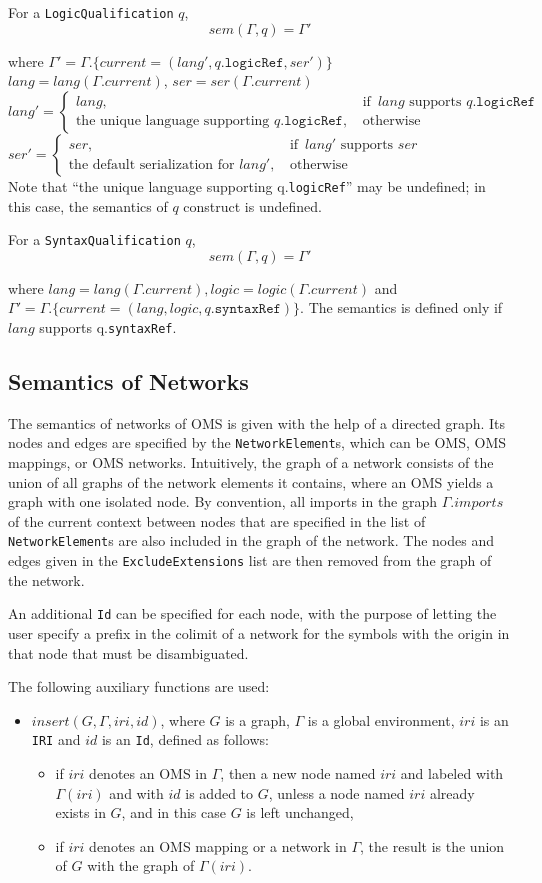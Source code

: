 \documentclass[10pt,fleqn,final]{scrreprt}
\newcommand*{\syntax}[1]{\texttt{#1}}
\newcommand{\mBox}[1]{\, \mbox{#1} \,}
\newcommand{\twocase}[3]{
\left\{
\begin{array}{ll}
  #1,&\mBox{if }#2\\
  #3,&\mBox{otherwise}
\end{array}\right.}
\newcommand{\current}{\mathit{current}}
\newcommand{\ssclause}[1]{\subsection{#1}}
\newenvironment{definitions}[0]{\medskip }{}
\begin{document}
\begin{definitions}
For a \syntax{LogicQualification} $q$,
 $$sem(\Gamma,q)=\Gamma'$$

 \noindent where 
 $\Gamma' = \Gamma.\{\current = (lang',q.\syntax{logicRef},ser')\}$\\
$lang = lang(\Gamma.\current)$, $ser=ser(\Gamma.\current)$\\
$lang'=\twocase{lang}{lang \textrm{ supports }
   q.\syntax{logicRef}} {\textrm{the unique language supporting
   }q.\syntax{logicRef}}
 $\\
$ser' = \twocase{ser}{lang' \textrm{ supports }
   ser} {\textrm{the default serialization for
   }lang'}$ 
 \\
 Note that ``the unique language supporting q.\syntax{logicRef}'' may
 be undefined; in this case, the semantics of $q$
 construct is undefined.

For a \syntax{SyntaxQualification} $q$,
$$sem(\Gamma,q)=\Gamma'$$

\noindent where $lang = lang(\Gamma.\current), logic = logic(\Gamma.\current)$ and\\
$\Gamma'  = \Gamma.\{\current = (lang, logic, q.\syntax{syntaxRef})\}$. 
The semantics is defined only if $\mathit{lang}$ supports q.\syntax{syntaxRef}.

\ssclause{Semantics of Networks}

The semantics of networks of OMS is given with the help of a directed graph. Its nodes
and edges are specified by the \syntax{NetworkElement}s, which can be OMS, OMS mappings, or OMS networks. Intuitively, the graph of a
network consists of the union of all graphs of the network elements it
contains, where an OMS yields a graph with one isolated node. By convention,
all imports in the graph $\Gamma.imports$ of the current context between nodes that are
specified in the list of \syntax{NetworkElement}s are also included in the graph of 
the network. 
The nodes and edges given in the \syntax{ExcludeExtensions} list are then removed from the graph of the network. 

An additional \syntax{Id} can be specified for each node, with the purpose of letting the user specify a 
prefix in the colimit of a network for the symbols with the origin in that node that must be disambiguated.

 The following auxiliary functions are used: 

\begin{itemize}
\item $insert(G, \Gamma, iri,id)$, where $G$ is a graph, 
      $\Gamma$ is a global environment, $iri$ is an \syntax{IRI} and 
      $id$ is an \syntax{Id}, defined as follows:
 \begin{itemize}
    \item if $iri$ denotes an OMS in $\Gamma$, then
                 a new node named $iri$ and labeled with $\Gamma(iri)$ and with $id$ is added to $G$,
                 unless a node named $iri$ already exists in $G$, and in this case $G$ is left unchanged,
   \item if $iri$ denotes an OMS mapping 
      or a network in $\Gamma$, 
      the result is the union of $G$ with the graph of $\Gamma(iri)$.
 \end{itemize}


\end{itemize}
\end{definitions}
\end{document}
